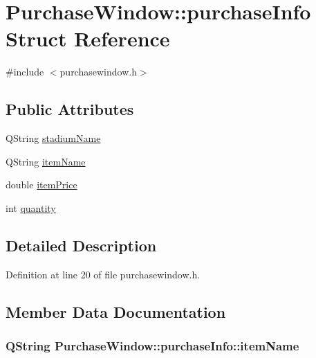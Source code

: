 \hypertarget{struct_purchase_window_1_1purchase_info}{}\section{Purchase\+Window\+:\+:purchase\+Info Struct Reference}
\label{struct_purchase_window_1_1purchase_info}


{\ttfamily \#include $<$purchasewindow.\+h$>$}

\subsection*{Public Attributes}
\begin{DoxyCompactItemize}
\item 
Q\+String \hyperlink{struct_purchase_window_1_1purchase_info_a36aa0c95851cabe4198c52a415936830}{stadium\+Name}
\item 
Q\+String \hyperlink{struct_purchase_window_1_1purchase_info_a49fb075ed3df267b7991658c08e4f0fe}{item\+Name}
\item 
double \hyperlink{struct_purchase_window_1_1purchase_info_a411ad453985ea6da851b601b2224e169}{item\+Price}
\item 
int \hyperlink{struct_purchase_window_1_1purchase_info_a2d9677095f95648ad805d8abafeae063}{quantity}
\end{DoxyCompactItemize}


\subsection{Detailed Description}


Definition at line 20 of file purchasewindow.\+h.



\subsection{Member Data Documentation}
\subsubsection[{\texorpdfstring{item\+Name}{itemName}}]{\setlength{\rightskip}{0pt plus 5cm}Q\+String Purchase\+Window\+::purchase\+Info\+::item\+Name}\hypertarget{struct_purchase_window_1_1purchase_info_a49fb075ed3df267b7991658c08e4f0fe}{}\label{struct_purchase_window_1_1purchase_info_a49fb075ed3df267b7991658c08e4f0fe}


